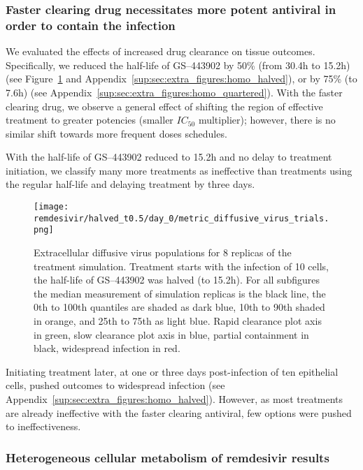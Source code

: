 \subsubsection{Faster clearing drug necessitates more potent antiviral in order to contain the infection}\label{sec:remdes:res:treat:faster}


We evaluated the effects of increased drug clearance on tissue outcomes. Specifically, we reduced the half-life of GS--443902 by 50\% (from 30.4h to 15.2h) (see Figure~\ref{fig:remdes:res:treat:half:diff_vir} and Appendix~\ref{sup:sec:extra_figures:homo_halved}), or by 75\% (to 7.6h) (see Appendix~\ref{sup:sec:extra_figures:homo_quartered}). With the faster clearing drug, we observe a general effect of shifting the region of effective treatment to greater potencies (smaller $IC_{50}$ multiplier); however, there is no similar shift towards more frequent doses schedules.

With the half-life of GS--443902 reduced to 15.2h and no delay to treatment initiation, we classify many more treatments as ineffective than treatments using the regular half-life and delaying treatment by three days.

\begin{figure}[H]
\centering
    \texttt{[image: remdesivir/halved\_t0.5/day\_0/metric\_diffusive\_virus\_trials.png]}
    \caption{Extracellular diffusive virus populations for 8 replicas of the treatment simulation. Treatment starts with the infection of 10 cells, the half-life of GS--443902 was halved (to 15.2h). For all subfigures the median measurement of simulation replicas is the black line, the 0th to 100th quantiles are shaded as dark blue, 10th to 90th shaded in orange, and 25th to 75th as light blue. Rapid clearance plot axis in green, slow clearance plot axis in blue, partial containment in black, widespread infection in red.}
    \label{fig:remdes:res:treat:half:diff_vir}
\end{figure}

Initiating treatment later, at one or three days post-infection of ten epithelial cells, pushed outcomes to widespread infection (see Appendix~\ref{sup:sec:extra_figures:homo_halved}). However, as most treatments are already ineffective with the faster clearing antiviral, few options were pushed to ineffectiveness.

\subsubsection{Heterogeneous cellular metabolism of remdesivir results}\label{sec:remdes:res:treat:hetero}

